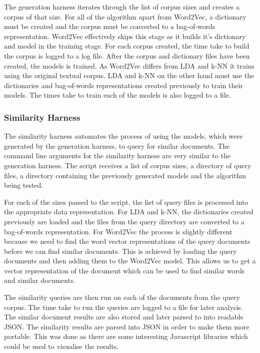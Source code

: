 The generation harness iterates through the list of corpus sizes and creates a corpus of that size.
For all of the algorithm apart from Word2Vec, a dictionary must be created and the corpus must be converted to a bag-of-words representation.
Word2Vec effectively skips this stage as it builds it's dictionary and model in the training stage.
For each corpus created, the time take to build the corpus is logged to a log file.
After the corpus and dictionary files have been created, the models is trained.
As Word2Vec differs from LDA and k-NN it trains using the original textual corpus.
LDA and k-NN on the other hand must use the dictionaries and bag-of-words representations created previously to train their models.
The times take to train each of the models is also logged to a file.

\subsubsection{Similarity Harness}
The similarity harness automates the process of using the models, which were generated by the generation harness, to query for similar documents.
The command line arguments for the similarity harness are very similar to the generation harness.
The script receives a list of corpus sizes, a directory of query files, a directory containing the previously generated models and the algorithm being tested.

For each of the sizes passed to the script, the list of query files is processed into the appropriate data representation.
For LDA and k-NN, the dictionaries created previously are loaded and the files from the query directory are converted to a bag-of-words representation.
For Word2Vec the process is slightly different because we need to find the word vector representations of the query documents before we can find similar documents.
This is achieved by loading the query documents and then adding them to the Word2Vec model.
This allows us to get a vector representation of the document which can be used to find similar words and similar documents.

The similarity queries are then run on each of the documents from the query corpus.
The time take to run the queries are logged to a file for later analysis.
The similar document results are also stored and later parsed to into readable JSON.
The similarity results are parsed into JSON in order to make them more portable.
This was done as there are some interesting Javascript libraries which could be used to visualise the results.

